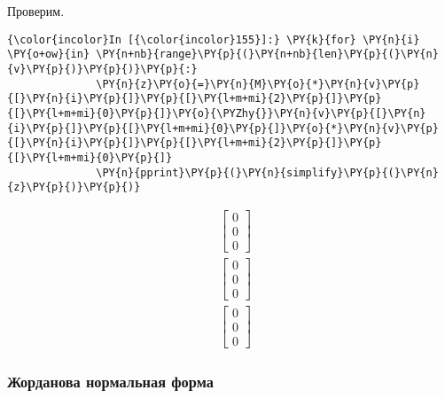     

    Проверим.

    \begin{Verbatim}[commandchars=\\\{\}]
{\color{incolor}In [{\color{incolor}155}]:} \PY{k}{for} \PY{n}{i} \PY{o+ow}{in} \PY{n+nb}{range}\PY{p}{(}\PY{n+nb}{len}\PY{p}{(}\PY{n}{v}\PY{p}{)}\PY{p}{)}\PY{p}{:}
              \PY{n}{z}\PY{o}{=}\PY{n}{M}\PY{o}{*}\PY{n}{v}\PY{p}{[}\PY{n}{i}\PY{p}{]}\PY{p}{[}\PY{l+m+mi}{2}\PY{p}{]}\PY{p}{[}\PY{l+m+mi}{0}\PY{p}{]}\PY{o}{\PYZhy{}}\PY{n}{v}\PY{p}{[}\PY{n}{i}\PY{p}{]}\PY{p}{[}\PY{l+m+mi}{0}\PY{p}{]}\PY{o}{*}\PY{n}{v}\PY{p}{[}\PY{n}{i}\PY{p}{]}\PY{p}{[}\PY{l+m+mi}{2}\PY{p}{]}\PY{p}{[}\PY{l+m+mi}{0}\PY{p}{]}
              \PY{n}{pprint}\PY{p}{(}\PY{n}{simplify}\PY{p}{(}\PY{n}{z}\PY{p}{)}\PY{p}{)}
\end{Verbatim}


\begin{align*}
&\left[\begin{matrix}0\\0\\0\end{matrix}\right]\\
&\left[\begin{matrix}0\\0\\0\end{matrix}\right]\\
&\left[\begin{matrix}0\\0\\0\end{matrix}\right]
\end{align*}

\subsubsection{Жорданова нормальная форма}
\label{sympy14}

